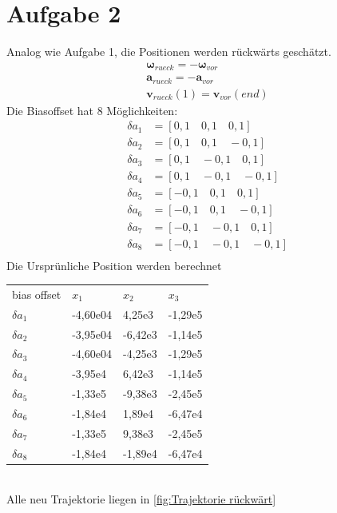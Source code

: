 \section{Aufgabe 2}
Analog wie Aufgabe 1, die Positionen werden rückwärts geschätzt. 
\begin{gather*}
	\bm{\omega}_{rueck} = - \bm{\omega}_{vor} \\
	\bm{a}_{rueck} = - \bm{a}_{vor} \\
	\bm{v}_{rueck}(1) = \bm{v}_{vor}(end)
\end{gather*} 
Die Biasoffset hat 8 Möglichkeiten:
\begin{align*}
	\delta a_1 & = [0,1\quad 0,1\quad 0,1] \\
	\delta a_2 & = [0,1\quad 0,1\quad -0,1] \\
	\delta a_3 & = [0,1\quad -0,1\quad 0,1] \\
	\delta a_4 & = [0,1\quad -0,1\quad -0,1] \\
	\delta a_5 & = [-0,1\quad 0,1\quad 0,1] \\
	\delta a_6 & = [-0,1\quad 0,1\quad -0,1] \\
	\delta a_7 & = [-0,1\quad -0,1\quad 0,1] \\
	\delta a_8 & = [-0,1\quad -0,1\quad -0,1] \\
\end{align*}
Die Ursprünliche Position werden berechnet
\begin{table}[htpb] \centering
	\begin{tabular}{llll}
		bias offset & $x_1$    & $x_2$   & $x_3$   \\
		$\delta a_1$ & -4,60e04 & 4,25e3  & -1,29e5 \\
		$\delta a_2$ & -3,95e04 & -6,42e3 & -1,14e5 \\
		$\delta a_3$ & -4,60e04 & -4,25e3 & -1,29e5 \\
		$\delta a_4$ & -3,95e4  & 6,42e3  & -1,14e5 \\
		$\delta a_5$ & -1,33e5  & -9,38e3 & -2,45e5 \\
		$\delta a_6$ & -1,84e4  & 1,89e4  & -6,47e4 \\
		$\delta a_7$ & -1,33e5  & 9,38e3  & -2,45e5 \\
		$\delta a_8$ & -1,84e4  & -1,89e4 & -6,47e4
	\end{tabular}
\end{table}\\
Alle neu Trajektorie liegen in \autoref{fig:Trajektorie rückwärt}

